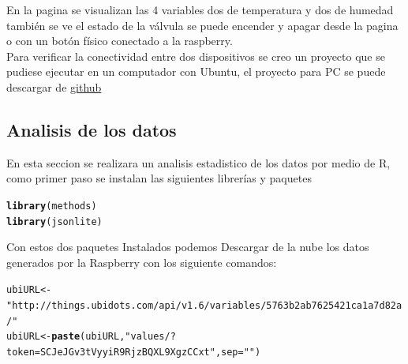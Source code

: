 \documentclass[10pt]{article}\usepackage[]{graphicx}\usepackage[]{color}
\makeatletter
\newcommand{\hlstr}[1]{\textcolor[rgb]{0.192,0.494,0.8}{#1}}%
\newcommand{\hlstd}[1]{\textcolor[rgb]{0.345,0.345,0.345}{#1}}%
\newcommand{\hlkwb}[1]{\textcolor[rgb]{0.69,0.353,0.396}{#1}}%
\newcommand{\hlkwc}[1]{\textcolor[rgb]{0.333,0.667,0.333}{#1}}%
\newcommand{\hlkwd}[1]{\textcolor[rgb]{0.737,0.353,0.396}{\textbf{#1}}}%
\newenvironment{kframe}{%
 \def\at@end@of@kframe{}%
 \ifinner\ifhmode%
  \def\at@end@of@kframe{\end{minipage}}%
  \begin{minipage}{\columnwidth}%
 \fi\fi%
 \def\FrameCommand##1{\hskip\@totalleftmargin \hskip-\fboxsep
 \colorbox{shadecolor}{##1}\hskip-\fboxsep
     \hskip-\linewidth \hskip-\@totalleftmargin \hskip\columnwidth}%
 \MakeFramed {\advance\hsize-\width
   \@totalleftmargin\z@ \linewidth\hsize
   \@setminipage}}%
 {\par\unskip\endMakeFramed%
 \at@end@of@kframe}
\newenvironment{knitrout}{}{} %
\makeatother
\begin{document}
En la pagina se visualizan las 4 variables dos de temperatura y dos de humedad también se ve el estado de la válvula se puede encender y apagar desde la pagina o con un botón físico conectado a la raspberry.\\
Para verificar la conectividad entre dos dispositivos se creo un proyecto que se pudiese ejecutar en un computador con Ubuntu, el proyecto para PC se puede descargar de \href{https://github.com/wilrilo/repo_final_nube/tree/master/repo_final_nube/programaF_PC}{github}
 
 \subsection{Analisis de los datos }
 	
 En esta seccion se realizara un analisis estadistico de los datos por medio de R, como primer paso se instalan las siguientes librerías y paquetes 	
\begin{knitrout}
\color{fgcolor}\begin{kframe}
\begin{alltt}
\hlkwd{library}\hlstd{(methods)}
\hlkwd{library}\hlstd{(jsonlite)}
\end{alltt}
\end{kframe}
\end{knitrout}

Con estos dos paquetes Instalados podemos Descargar de la nube los datos generados por la Raspberry con los siguiente comandos:

\begin{knitrout}
\color{fgcolor}\begin{kframe}
\begin{alltt}
\hlstd{ubiURL}\hlkwb{<-}\hlstr{"http://things.ubidots.com/api/v1.6/variables/5763b2ab7625421ca1a7d82a/"}
\hlstd{ubiURL}\hlkwb{<-}\hlkwd{paste}\hlstd{(ubiURL,}\hlstr{"values/?token=SCJeJGv3tVyyiR9RjzBQXL9XgzCCxt"}\hlstd{,}\hlkwc{sep} \hlstd{=} \hlstr{""}\hlstd{)}
\end{alltt}
\end{kframe}
\end{knitrout}
\end{document}
